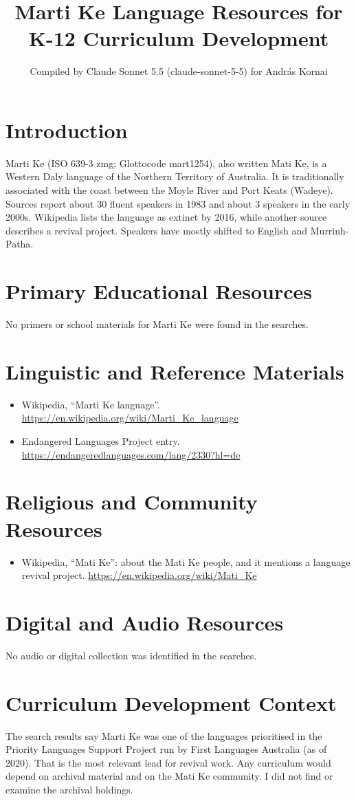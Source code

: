 \documentclass[12pt]{article}
\title{Marti Ke Language Resources for K-12 Curriculum Development}
\author{Compiled by Claude Sonnet 5.5 (claude-sonnet-5-5) for Andr\'as Kornai}
\date{}
\begin{document}
\maketitle

\section{Introduction}
Marti Ke (ISO 639-3 zmg; Glottocode mart1254), also written Mati Ke, is a Western Daly language of the Northern Territory of Australia. It is traditionally associated with the coast between the Moyle River and Port Keats (Wadeye). Sources report about 30 fluent speakers in 1983 and about 3 speakers in the early 2000s. Wikipedia lists the language as extinct by 2016, while another source describes a revival project. Speakers have mostly shifted to English and Murrinh-Patha.

\section{Primary Educational Resources}
No primers or school materials for Marti Ke were found in the searches.

\section{Linguistic and Reference Materials}
\begin{itemize}
\item Wikipedia, ``Marti Ke language''. \url{https://en.wikipedia.org/wiki/Marti_Ke_language}
\item Endangered Languages Project entry. \url{https://endangeredlanguages.com/lang/2330?hl=de}
\end{itemize}

\section{Religious and Community Resources}
\begin{itemize}
\item Wikipedia, ``Mati Ke'': about the Mati Ke people, and it mentions a language revival project. \url{https://en.wikipedia.org/wiki/Mati_Ke}
\end{itemize}

\section{Digital and Audio Resources}
No audio or digital collection was identified in the searches.

\section{Curriculum Development Context}
The search results say Marti Ke was one of the languages prioritised in the Priority Languages Support Project run by First Languages Australia (as of 2020). That is the most relevant lead for revival work. Any curriculum would depend on archival material and on the Mati Ke community. I did not find or examine the archival holdings.
\end{document}
